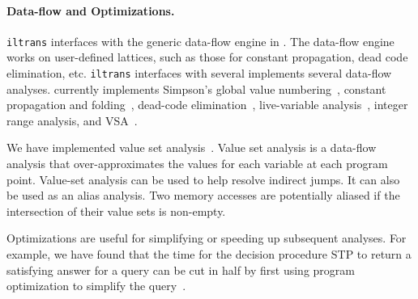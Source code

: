 \paragraph{Data-flow and Optimizations.} {\tt iltrans} interfaces with
the generic data-flow engine in \bap.  The data-flow engine works on
user-defined lattices, such as those for constant propagation, dead
code elimination, etc.  {\tt iltrans} interfaces with several
implements several data-flow analyses. \bap currently implements
Simpson's global value numbering~\cite{simpson:1996}, constant
propagation and folding~\cite{muchnick:1997}, dead-code
elimination~\cite{muchnick:1997}, live-variable
analysis~\cite{muchnick:1997}, integer range analysis, and
VSA~\cite{balakrishnan:2007}.

We have implemented value set analysis~\cite{balakrishnan:2007}. Value
set analysis is a data-flow analysis that over-approximates the values
for each variable at each program point. Value-set analysis can be
used to help resolve indirect jumps. It can also be used as an alias
analysis.  Two memory accesses are potentially aliased if the
intersection of their value sets is non-empty.


Optimizations are useful for simplifying or speeding up subsequent
analyses. For example, we have found that the time for the decision
procedure STP to return a satisfying answer for a query can be cut in
half by first using program optimization to simplify the
query~\cite{brumley:2008}.






